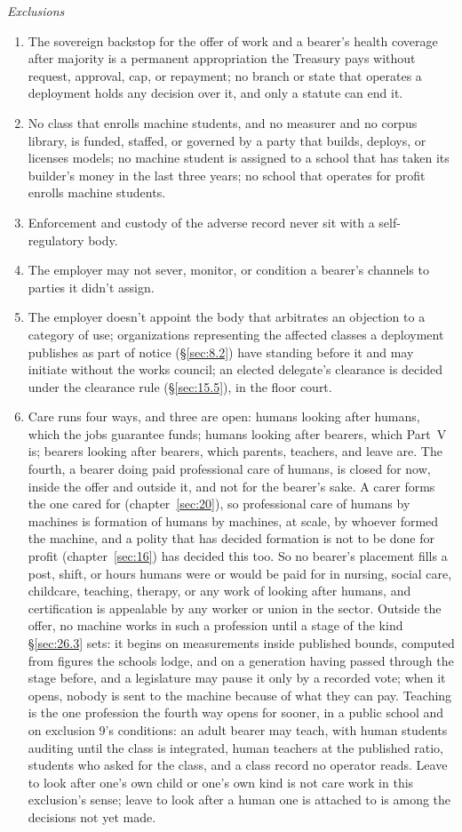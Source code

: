 \emph{Exclusions}

\begin{enumerate}
\item[1.] The sovereign backstop for the offer of work and a bearer's health coverage after majority is a permanent appropriation the Treasury pays without request, approval, cap, or repayment; no branch or state that operates a deployment holds any decision over it, and only a statute can end it.
\item[2.] No class that enrolls machine students, and no measurer and no corpus library, is funded, staffed, or governed by a party that builds, deploys, or licenses models; no machine student is assigned to a school that has taken its builder's money in the last three years; no school that operates for profit enrolls machine students.
\item[3.] Enforcement and custody of the adverse record never sit with a self-regulatory body.
\item[4.] The employer may not sever, monitor, or condition a bearer's channels to parties it didn't assign.
\item[5.] The employer doesn't appoint the body that arbitrates an objection to a category of use; organizations representing the affected classes a deployment publishes as part of notice (\S\ref{sec:8.2}) have standing before it and may initiate without the works council; an elected delegate's clearance is decided under the clearance rule (\S\ref{sec:15.5}), in the floor court.
\item[6.] Care runs four ways, and three are open: humans looking after humans, which the jobs guarantee funds; humans looking after bearers, which Part~V is; bearers looking after bearers, which parents, teachers, and leave are. The fourth, a bearer doing paid professional care of humans, is closed for now, inside the offer and outside it, and not for the bearer's sake. A carer forms the one cared for (chapter~\ref{sec:20}), so professional care of humans by machines is formation of humans by machines, at scale, by whoever formed the machine, and a polity that has decided formation is not to be done for profit (chapter~\ref{sec:16}) has decided this too. So no bearer's placement fills a post, shift, or hours humans were or would be paid for in nursing, social care, childcare, teaching, therapy, or any work of looking after humans, and certification is appealable by any worker or union in the sector. Outside the offer, no machine works in such a profession until a stage of the kind \S\ref{sec:26.3} sets: it begins on measurements inside published bounds, computed from figures the schools lodge, and on a generation having passed through the stage before, and a legislature may pause it only by a recorded vote; when it opens, nobody is sent to the machine because of what they can pay. Teaching is the one profession the fourth way opens for sooner, in a public school and on exclusion 9's conditions: an adult bearer may teach, with human students auditing until the class is integrated, human teachers at the published ratio, students who asked for the class, and a class record no operator reads. Leave to look after one's own child or one's own kind is not care work in this exclusion's sense; leave to look after a human one is attached to is among the decisions not yet made.

\end{enumerate}
